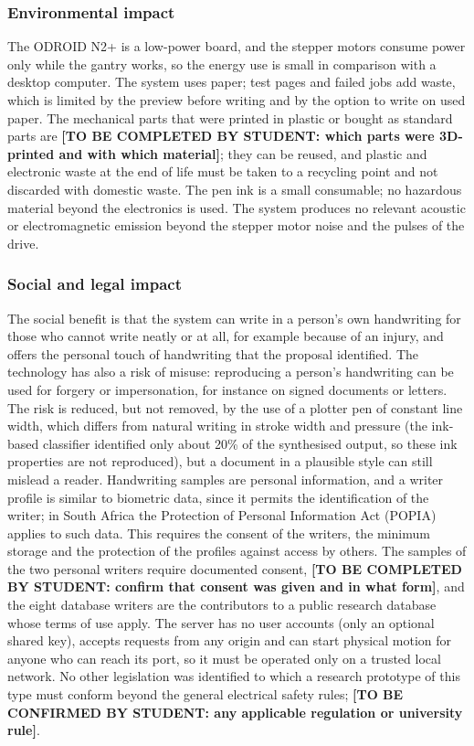     \subsubsection{Environmental impact}

        The ODROID N2+ is a low-power board, and the stepper motors consume power only while the gantry works, so the energy use is small in comparison with a desktop computer.
        The system uses paper; test pages and failed jobs add waste, which is limited by the preview before writing and by the option to write on used paper.
        The mechanical parts that were printed in plastic or bought as standard parts are \textbf{[TO BE COMPLETED BY STUDENT: which parts were 3D-printed and with which material]}; they can be reused, and plastic and electronic waste at the end of life must be taken to a recycling point and not discarded with domestic waste.
        The pen ink is a small consumable; no hazardous material beyond the electronics is used.
        The system produces no relevant acoustic or electromagnetic emission beyond the stepper motor noise and the pulses of the drive.

    \subsubsection{Social and legal impact}

        The social benefit is that the system can write in a person's own handwriting for those who cannot write neatly or at all, for example because of an injury, and offers the personal touch of handwriting that the proposal identified.
        The technology has also a risk of misuse: reproducing a person's handwriting can be used for forgery or impersonation, for instance on signed documents or letters.
        The risk is reduced, but not removed, by the use of a plotter pen of constant line width, which differs from natural writing in stroke width and pressure (the ink-based classifier identified only about 20\% of the synthesised output, so these ink properties are not reproduced), but a document in a plausible style can still mislead a reader.
        Handwriting samples are personal information, and a writer profile is similar to biometric data, since it permits the identification of the writer; in South Africa the Protection of Personal Information Act (POPIA) applies to such data.
        This requires the consent of the writers, the minimum storage and the protection of the profiles against access by others.
        The samples of the two personal writers require documented consent, \textbf{[TO BE COMPLETED BY STUDENT: confirm that consent was given and in what form]}, and the eight database writers are the contributors to a public research database whose terms of use apply.
        The server has no user accounts (only an optional shared key), accepts requests from any origin and can start physical motion for anyone who can reach its port, so it must be operated only on a trusted local network.
        No other legislation was identified to which a research prototype of this type must conform beyond the general electrical safety rules; \textbf{[TO BE CONFIRMED BY STUDENT: any applicable regulation or university rule]}.

